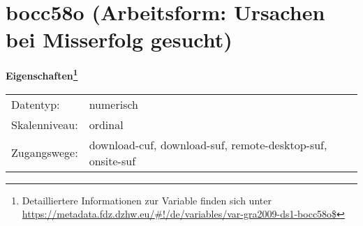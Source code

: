 
    \setcounter{footnote}{0}

    \vspace*{-1.8cm}
	\section{bocc58o (Arbeitsform: Ursachen bei Misserfolg gesucht)}
	\label{section:bocc58o}



    \vspace*{0.5cm}
    \noindent\textbf{Eigenschaften\footnote{Detailliertere Informationen zur Variable finden sich unter
		\url{https://metadata.fdz.dzhw.eu/\#!/de/variables/var-gra2009-ds1-bocc58o$}}}\\
	\begin{tabularx}{\hsize}{@{}lX}
	Datentyp: & numerisch \\
	Skalenniveau: & ordinal \\
	Zugangswege: &
	  download-cuf, 
	  download-suf, 
	  remote-desktop-suf, 
	  onsite-suf
 \\
    \end{tabularx}



